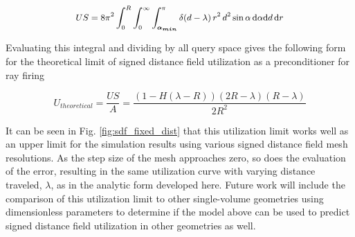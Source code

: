 \begin{equation}
\small US = 8\pi^2  \int_{0}^{R}\int_{0}^{\infty}\int_{\boldsymbol{\alpha_{min}}}^{\pi} \delta(d-\lambda) \,
r^2 \, d^2 \sin{\alpha} \, \mathrm{d}\alpha \mathrm{d}d \, \mathrm{d}r
\label{eq:subs_a_cond}
\end{equation}

Evaluating this integral and dividing by all query space gives the
following form for the theoretical limit of signed distance field utilization as a
preconditioner for ray firing

\begin{equation}
U_{theoretical} = \frac{US}{A} =  \frac{(1-H(\lambda-R))(2R-\lambda)(R-\lambda)}{2R^2}
\end{equation}

It can be seen in Fig. \ref{fig:sdf_fixed_dist} that this utilization limit
works well as an upper limit for the simulation results using various signed
distance field mesh resolutions. As the step size of the mesh approaches zero,
so does the evaluation of the error, resulting in the same utilization curve
with varying distance traveled, $\lambda$, as in the analytic form developed
here. Future work will include the comparison of this utilization limit to other
single-volume geometries using dimensionless parameters to determine if the
model above can be used to predict signed distance field utilization in other
geometries as well.




